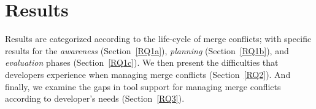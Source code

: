 \section{Results}\label{results}

Results are categorized according to the life-cycle of merge conflicts; with specific results for the \textit{awareness} (Section~\ref{RQ1a}), \textit{planning} (Section~\ref{RQ1b}), and \textit{evaluation} phases (Section~\ref{RQ1c}).
We then present the difficulties that developers experience when managing merge conflicts (Section~\ref{RQ2}).
And finally, we examine the gaps in tool support for managing merge conflicts according to developer's needs (Section~\ref{RQ3}).




